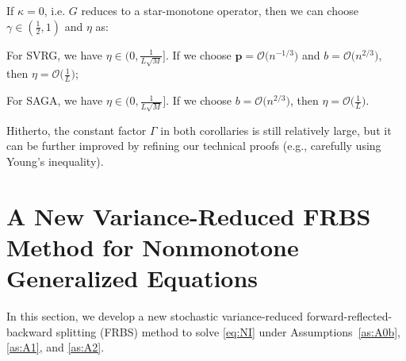 \documentclass{article}
\newcommand{\BigOs}[1]{\mathcal{O}\big(#1\big)}
\newcommand{\mbf}[1]{\mathbf{#1}}
\newcommand{\beforesec}{\vspace{-1.5ex}}
\newcommand{\aftersec}{\vspace{-1.25ex}}
\newcommand{\beforesubsec}{\vspace{-1.5ex}}
\theoremstyle{plain}
\theoremstyle{definition}
\theoremstyle{remark}
\begin{document}
\vspace{-0.5ex}
If $\kappa = 0$, i.e. $G$ reduces to a star-monotone operator, then we can choose $\gamma \in \left(\frac{1}{2}, 1\right)$ and $\eta$ as:
\vspace{-0.25ex}
\begin{compactitem}
\item For SVRG, we have  $\eta \in \big(0, \frac{1}{L\sqrt{M}}\big]$. 
If we choose $\mbf{p} = \BigOs{n^{-1/3}}$ and $b = \BigOs{n^{2/3}}$, then $\eta = \BigOs{\frac{1}{L}}$;
\item For SAGA, we have $\eta \in \big(0, \frac{1}{L\sqrt{M}}\big]$.
If we choose $b = \BigOs{n^{2/3}}$, then $\eta = \BigOs{\frac{1}{L}}$.
\end{compactitem}
\vspace{-0.25ex}
Hitherto, the constant factor $\Gamma$ in both corollaries is still relatively large, but it can be further improved  by refining our technical proofs (e.g., carefully using Young's inequality).

\beforesec
\section{A New Variance-Reduced FRBS Method for Nonmonotone Generalized Equations}\label{sec:VROG4NI}
\aftersec
\vspace{0.25ex}
In this section, we develop a new stochastic variance-reduced forward-reflected-backward splitting (FRBS) method to solve \eqref{eq:NI} under Assumptions~\ref{as:A0b}, \ref{as:A1}, and \ref{as:A2}.

\beforesubsec
\end{document}
